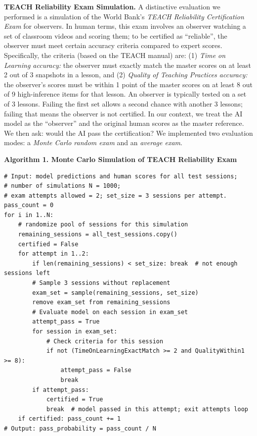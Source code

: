 \documentclass[12pt]{article}
\begin{document}
\textbf{TEACH Reliability Exam Simulation.} A distinctive evaluation we performed is a simulation of the World Bank’s \textit{TEACH Reliability Certification Exam} for observers. In human terms, this exam involves an observer watching a set of classroom videos and scoring them; to be certified as “reliable”, the observer must meet certain accuracy criteria compared to expert scores. Specifically, the criteria (based on the TEACH manual) are: (1) \textit{Time on Learning accuracy:} the observer must exactly match the master scores on at least 2 out of 3 snapshots in a lesson, and (2) \textit{Quality of Teaching Practices accuracy:} the observer’s scores must be within 1 point of the master scores on at least 8 out of 9 high-inference items for that lesson. An observer is typically tested on a set of 3 lessons. Failing the first set allows a second chance with another 3 lessons; failing that means the observer is not certified. In our context, we treat the AI model as the “observer” and the original human scores as the master reference. We then ask: would the AI pass the certification? We implemented two evaluation modes: a \textit{Monte Carlo random exam} and an \textit{average exam}.

\vspace{1ex}
\noindent \textbf{Algorithm 1. Monte Carlo Simulation of TEACH Reliability Exam}
\begin{lstlisting}[basicstyle=\small\ttfamily, frame=single]
# Input: model predictions and human scores for all test sessions;
# number of simulations N = 1000;
# exam attempts allowed = 2; set_size = 3 sessions per attempt.
pass_count = 0
for i in 1..N:
    # randomize pool of sessions for this simulation
    remaining_sessions = all_test_sessions.copy()
    certified = False
    for attempt in 1..2:
        if len(remaining_sessions) < set_size: break  # not enough sessions left
        # Sample 3 sessions without replacement
        exam_set = sample(remaining_sessions, set_size)
        remove exam_set from remaining_sessions
        # Evaluate model on each session in exam_set
        attempt_pass = True
        for session in exam_set:
            # Check criteria for this session
            if not (TimeOnLearningExactMatch >= 2 and QualityWithin1 >= 8):
                attempt_pass = False
                break
        if attempt_pass:
            certified = True
            break  # model passed in this attempt; exit attempts loop
    if certified: pass_count += 1
# Output: pass_probability = pass_count / N
\end{lstlisting}
\end{document}
